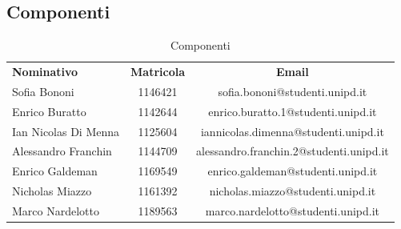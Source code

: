 \documentclass[../piano-di-progetto.tex]{subfiles}
\begin{document}
  \subsection{Componenti}
  \begin{table}[H]
    \centering
    \begin{tabular}{lcc}
      \rowcolor{lightgray}
      \textbf{Nominativo}  & \textbf{Matricola} & \textbf{Email}  \\   
      Sofia Bononi & 1146421 & sofia.bononi@studenti.unipd.it              \\
      Enrico Buratto & 1142644 & enrico.buratto.1@studenti.unipd.it               \\
      Ian Nicolas Di Menna & 1125604 & iannicolas.dimenna@studenti.unipd.it             \\
      Alessandro Franchin & 1144709 & alessandro.franchin.2@studenti.unipd.it               \\
      Enrico Galdeman & 1169549 & enrico.galdeman@studenti.unipd.it               \\
      Nicholas Miazzo & 1161392 & nicholas.miazzo@studenti.unipd.it               \\
      Marco Nardelotto & 1189563 & marco.nardelotto@studenti.unipd.it
    \end{tabular}
    \caption{Componenti}
  \end{table}
\end{document}

